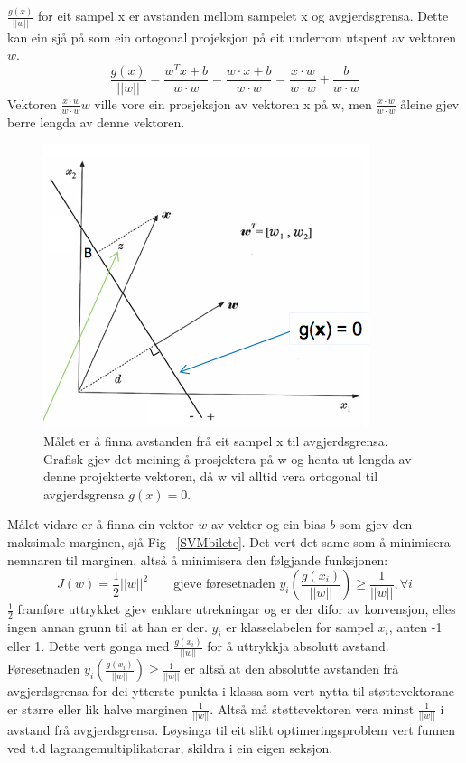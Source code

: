 \documentclass[oneside, nynorsk]{book}
\begin{document}
$\frac{g(x)}{||w||}$ for eit sampel x er avstanden mellom sampelet x og avgjerdsgrensa.
Dette kan ein sjå på som ein ortogonal projeksjon på eit underrom utspent av vektoren $w$.
\[\frac{g(x)}{||w||}=\frac{w^Tx + b}{w\cdot w}=\frac{w \cdot x + b}{w\cdot w}=\frac{x \cdot w}{w\cdot w}+ \frac{b}{w\cdot w}\]
Vektoren $\frac{x \cdot w}{w\cdot w}w$ ville vore ein prosjeksjon av vektoren x på w, men $\frac{x \cdot w}{w\cdot w}$ åleine gjev berre lengda av denne vektoren.
 \begin{figure}[h!]
     \centering
     \centerline{\includegraphics[width=0.6\linewidth]{SVMmath}}
     \caption{Målet er å finna avstanden frå eit sampel x til avgjerdsgrensa. Grafisk gjev det meining å prosjektera på w og henta ut lengda av denne projekterte vektoren, då w vil alltid vera ortogonal til avgjerdsgrensa $g(x)=0$.}
     \label{SVMmath}
 \end{figure}


Målet vidare er å finna ein vektor $w$ av vekter og ein bias $b$ som gjev den maksimale marginen, sjå Fig ~\ref{SVMbilete}.
Det vert det same som å minimisera nemnaren til marginen, altså å minimisera den følgjande funksjonen:
\[J(w)=\frac{1}{2}||w||^2 \qquad \text{gjeve føresetnaden $y_i(\frac{g(x_i)}{||w||})\geq \frac{1}{||w||}$}, \forall i\]
$\frac{1}{2}$ framføre uttrykket gjev enklare utrekningar og er der difor av konvensjon, elles ingen annan grunn til at han er der.
$y_i$ er klasselabelen for sampel $x_i$, anten -1 eller 1. Dette vert gonga med $\frac{g(x_i)}{||w||}$ for å uttrykkja absolutt avstand.
Føresetnaden $y_i(\frac{g(x_i)}{||w||})\geq \frac{1}{||w||}$ er altså at den absolutte avstanden frå avgjerdsgrensa for dei ytterste punkta i klassa som vert nytta til støttevektorane
er større eller lik halve marginen $\frac{1}{||w||}$. Altså må støttevektoren vera minst $\frac{1}{||w||}$ i avstand frå avgjerdsgrensa.
Løysinga til eit slikt optimeringsproblem vert funnen ved t.d lagrangemultiplikatorar, skildra i ein eigen seksjon.
\end{document}
